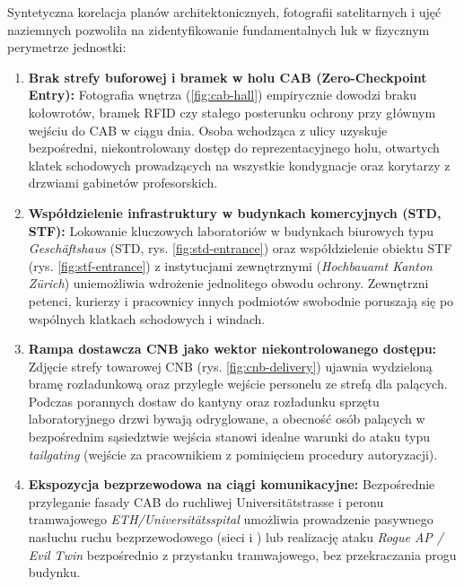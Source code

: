 

Syntetyczna korelacja planów architektonicznych, fotografii satelitarnych i ujęć naziemnych pozwoliła na zidentyfikowanie fundamentalnych luk w fizycznym perymetrze jednostki:

\begin{enumerate}
    \item \textbf{Brak strefy buforowej i bramek w holu CAB (Zero-Checkpoint Entry):} Fotografia wnętrza (\ref{fig:cab-hall}) empirycznie dowodzi braku kołowrotów, bramek RFID czy stałego posterunku ochrony przy głównym wejściu do CAB w ciągu dnia. Osoba wchodząca z ulicy uzyskuje bezpośredni, niekontrolowany dostęp do reprezentacyjnego holu, otwartych klatek schodowych prowadzących na wszystkie kondygnacje oraz korytarzy z drzwiami gabinetów profesorskich.
    \item \textbf{Współdzielenie infrastruktury w budynkach komercyjnych (STD, STF):} Lokowanie kluczowych laboratoriów w budynkach biurowych typu \textit{Geschäftshaus} (STD, rys. \ref{fig:std-entrance}) oraz współdzielenie obiektu STF (rys. \ref{fig:stf-entrance}) z instytucjami zewnętrznymi (\textit{Hochbauamt Kanton Zürich}) uniemożliwia wdrożenie jednolitego obwodu ochrony. Zewnętrzni petenci, kurierzy i pracownicy innych podmiotów swobodnie poruszają się po wspólnych klatkach schodowych i windach.
    \item \textbf{Rampa dostawcza CNB jako wektor niekontrolowanego dostępu:} Zdjęcie strefy towarowej CNB (rys. \ref{fig:cnb-delivery}) ujawnia wydzieloną bramę rozładunkową oraz przyległe wejście personelu ze strefą dla palących. Podczas porannych dostaw do kantyny oraz rozładunku sprzętu laboratoryjnego drzwi bywają odryglowane, a obecność osób palących w bezpośrednim sąsiedztwie wejścia stanowi idealne warunki do ataku typu \textit{tailgating} (wejście za pracownikiem z pominięciem procedury autoryzacji).
    \item \textbf{Ekspozycja bezprzewodowa na ciągi komunikacyjne:} Bezpośrednie przyleganie fasady CAB do ruchliwej Universitätstrasse i peronu tramwajowego \textit{ETH/Universitätsspital} umożliwia prowadzenie pasywnego nasłuchu ruchu bezprzewodowego (sieci  i ) lub realizację ataku \textit{Rogue AP / Evil Twin} bezpośrednio z przystanku tramwajowego, bez przekraczania progu budynku.
\end{enumerate}

